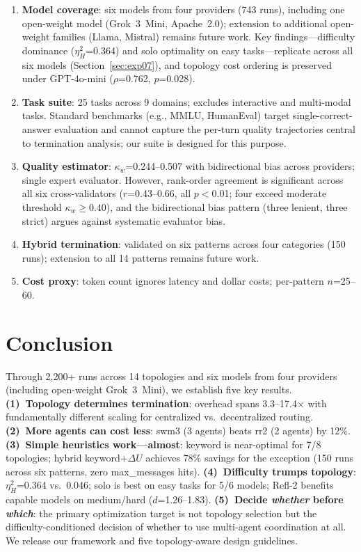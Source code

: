 \documentclass{article}
\begin{document}
\begin{enumerate}
\item \textbf{Model coverage}: six models from four providers (743 runs), including one open-weight model (Grok~3~Mini, Apache~2.0); extension to additional open-weight families (Llama, Mistral) remains future work. Key findings---difficulty dominance ($\eta^2_H$=0.364) and solo optimality on easy tasks---replicate across all six models (Section~\ref{sec:exp07}), and topology cost ordering is preserved under GPT-4o-mini ($\rho$=0.762, $p$=0.028).
\item \textbf{Task suite}: 25 tasks across 9 domains; excludes interactive and multi-modal tasks. Standard benchmarks (e.g., MMLU, HumanEval) target single-correct-answer evaluation and cannot capture the per-turn quality trajectories central to termination analysis; our suite is designed for this purpose.
\item \textbf{Quality estimator}: $\kappa_w$=0.244--0.507 with bidirectional bias across providers; single expert evaluator. However, rank-order agreement is significant across all six cross-validators ($r$=0.43--0.66, all $p<$0.01; four exceed moderate threshold $\kappa_w \geq 0.40$), and the bidirectional bias pattern (three lenient, three strict) argues against systematic evaluator bias.
\item \textbf{Hybrid termination}: validated on six patterns across four categories (150 runs); extension to all 14 patterns remains future work.
\item \textbf{Cost proxy}: token count ignores latency and dollar costs; per-pattern $n$=25--60.
\end{enumerate}

\vspace{-1mm}
\section{Conclusion}
\label{sec:conclusion}
\vspace{-1mm}

Through 2,200+ runs across 14 topologies and six models from four providers (including open-weight Grok~3~Mini), we establish five key results. \textbf{(1)~Topology determines termination}: overhead spans 3.3--17.4$\times$ with fundamentally different scaling for centralized vs.\ decentralized routing. \textbf{(2)~More agents can cost less}: swm3 (3 agents) beats rr2 (2 agents) by 12\%. \textbf{(3)~Simple heuristics work---almost}: keyword is near-optimal for 7/8 topologies; hybrid keyword+$\Delta U$ achieves 78\% savings for the exception (150 runs across six patterns, zero max\_messages hits). \textbf{(4)~Difficulty trumps topology}: $\eta^2_H$=0.364 vs.\ 0.046; solo is best on easy tasks for 5/6 models; Refl-2 benefits capable models on medium/hard ($d$=1.26--1.83). \textbf{(5)~Decide \emph{whether} before \emph{which}}: the primary optimization target is not topology selection but the difficulty-conditioned decision of whether to use multi-agent coordination at all. We release our framework and five topology-aware design guidelines.
\end{document}
